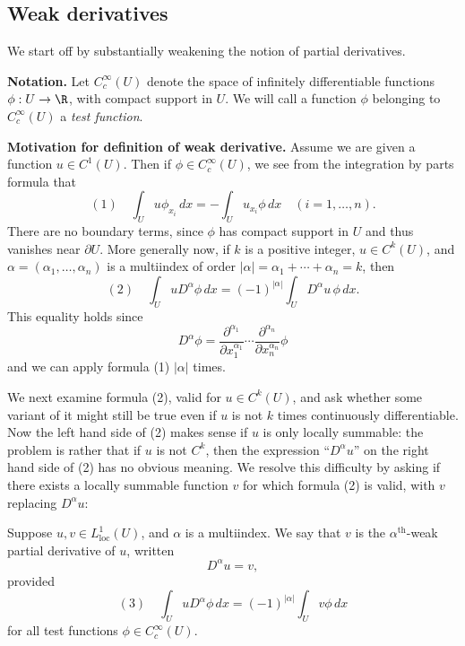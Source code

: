\subsection{Weak derivatives}

We start off by substantially weakening the notion of partial derivatives.

\textbf{Notation.} Let $C_c^\infty(U)$ denote the space of infinitely differentiable functions $\phi: U \to \R$, with compact support in $U$. We will call a function $\phi$ belonging to $C_c^\infty(U)$ a \textit{test function}.

\textbf{Motivation for definition of weak derivative.} Assume we are given a function $u \in C^1(U)$. Then if $\phi \in C_c^\infty(U)$, we see from the integration by parts formula that
$$(1) \quad \int_U u\phi_{x_i}\,dx = -\int_U u_{x_i}\phi\,dx \quad (i=1,\ldots,n).$$
There are no boundary terms, since $\phi$ has compact support in $U$ and thus vanishes near $\partial U$. More generally now, if $k$ is a positive integer, $u \in C^k(U)$, and $\alpha = (\alpha_1,\ldots,\alpha_n)$ is a multiindex of order $|\alpha| = \alpha_1 + \cdots + \alpha_n = k$, then
$$(2) \quad \int_U uD^\alpha\phi\,dx = (-1)^{|\alpha|}\int_U D^\alpha u\,\phi\,dx.$$
This equality holds since
$$D^\alpha\phi = \frac{\partial^{\alpha_1}}{\partial x_1^{\alpha_1}} \cdots \frac{\partial^{\alpha_n}}{\partial x_n^{\alpha_n}}\phi$$
and we can apply formula (1) $|\alpha|$ times.

We next examine formula (2), valid for $u \in C^k(U)$, and ask whether some variant of it might still be true even if $u$ is not $k$ times continuously differentiable. Now the left hand side of (2) makes sense if $u$ is only locally summable: the problem is rather that if $u$ is not $C^k$, then the expression ``$D^\alpha u$'' on the right hand side of (2) has no obvious meaning. We resolve this difficulty by asking if there exists a locally summable function $v$ for which formula (2) is valid, with $v$ replacing $D^\alpha u$:

\begin{definition}
\label{def:weak-partial-derivative}
Suppose $u, v \in L^1_{\text{loc}}(U)$, and $\alpha$ is a multiindex. We say that $v$ is the $\alpha^{\text{th}}$-weak partial derivative of $u$, written
$$D^\alpha u = v,$$
provided
$$(3) \quad \int_U u D^\alpha \phi \, dx = (-1)^{|\alpha|} \int_U v\phi \, dx$$
for all test functions $\phi \in C_c^\infty(U)$.
\end{definition}

